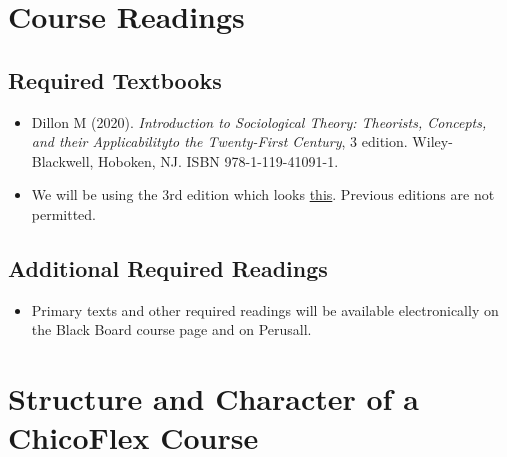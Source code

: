 \documentclass[11pt,]{article}
\providecommand{\tightlist}{%
  \setlength{\itemsep}{0pt}\setlength{\parskip}{0pt}}
\begin{document}
\hypertarget{course-readings}{%
\section{Course Readings}\label{course-readings}}

\hypertarget{required-textbooks}{%
\subsection{Required Textbooks}\label{required-textbooks}}

\begin{itemize}
\item
  Dillon M (2020). \emph{Introduction to Sociological Theory: Theorists,
  Concepts, and their Applicabilityto the Twenty-First Century}, 3
  edition. Wiley-Blackwell, Hoboken, NJ. ISBN 978-1-119-41091-1.
\item
  We will be using the 3rd edition which looks
  \href{https://www.abebooks.com/Introduction-Sociological-Theory-Theorists-Concepts-Applicability/31208296728/bd?cm_mmc=ggl-_-US_Shopp_Textbook-_-product_id=COM9781119410911USED-_-keyword=\&gclid=Cj0KCQjwuO6WBhDLARIsAIdeyDLJvr2N_LKW1qd-49HuMemlLuCRQT4yR3PKWnmeqMDWBDwy9LNFFRUaAlcyEALw_wcB}{this}.
  Previous editions are not permitted.
\end{itemize}

\hypertarget{additional-required-readings}{%
\subsection{Additional Required
Readings}\label{additional-required-readings}}

\begin{itemize}
\tightlist
\item
  Primary texts and other required readings will be available
  electronically on the Black Board course page and on Perusall.
\end{itemize}

\hypertarget{structure-and-character-of-a-chicoflex-course}{%
\section{Structure and Character of a ChicoFlex
Course}\label{structure-and-character-of-a-chicoflex-course}}
\end{document}
